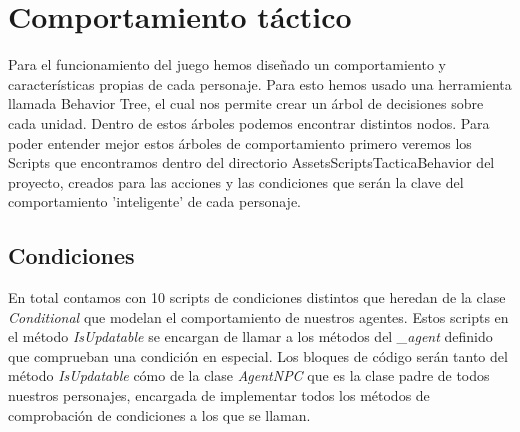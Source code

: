 \section{Comportamiento táctico}
Para el funcionamiento del juego hemos diseñado un comportamiento y características propias de cada personaje. Para esto hemos usado una herramienta llamada Behavior Tree, el cual nos permite crear un árbol de decisiones sobre cada unidad. Dentro de estos árboles podemos encontrar distintos nodos. Para poder entender mejor estos árboles de comportamiento primero veremos los Scripts que encontramos dentro  del directorio Assets\/Scripts\/Tactica\/Behavior del proyecto, creados para las acciones y las condiciones que serán la clave del comportamiento 'inteligente' de cada personaje.

\subsection{Condiciones}
En total contamos con 10 scripts de condiciones distintos que heredan de la clase \textit{Conditional} que modelan el comportamiento de nuestros agentes. Estos scripts en el método \textit{IsUpdatable} se encargan de llamar a los métodos del \textit{\_agent} definido que comprueban una condición en especial. Los bloques de código serán tanto del método \textit{IsUpdatable} cómo de la clase \textit{AgentNPC} que es la clase padre de todos nuestros personajes, encargada de implementar todos los métodos de comprobación de condiciones a los que se llaman. 

